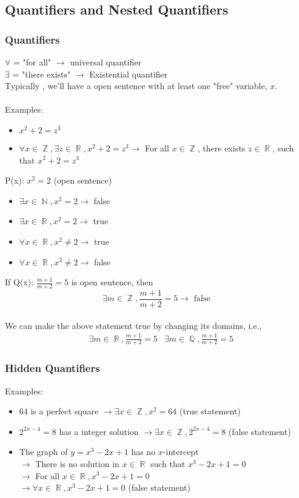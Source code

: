 \documentclass[10pt]{article}
\DeclareMathOperator{\N}{{\mathbb{N}}}
\DeclareMathOperator{\Q}{{\mathbb{Q}}}
\DeclareMathOperator{\Z}{{\mathbb{Z}}}
\DeclareMathOperator{\R}{{\mathbb{R}}}
\theoremstyle{break}
\begin{document}
\subsection{Quantifiers and Nested Quantifiers}
\subsubsection{Quantifiers}
$\forall$ = "for all" $\to$ universal quantifier\\
$\exists$ = "there exists" $\to$ Existential quantifier\\
Typically , we'll have a open sentence with at least one "free" variable, $x$. 
\\ \vspace{1ex} \\
Examples: 
\begin{itemize}
    \item $x^2 + 2 = z^3$
    \item $\forall x \in \Z, \exists z \in \R, x^2 + 2 = z^3 \to $ For all $x \in \Z$, there exists $z \in \R$, such that $x^2 + 2 = z^3$
\end{itemize}
P(x): $x^2 = 2$ (open sentence)
\begin{itemize}
    \item $\exists x \in \N, x^2 = 2 \to $ false
    \item $\exists x \in \R, x^2 = 2 \to $ true
    \item $\forall x \in \R, x^2 \ne 2 \to $ true
    \item $\forall x \in \R, x^2 \ne 2 \to $ false
\end{itemize}
If Q(x): $\frac{m+1}{m+2} = 5$ is open sentence, then \\
$$\exists m \in \Z, \frac{m+1}{m+2} = 5 \to \text{ false }$$\\
We can make the above statement true by changing its domains, i.e., \\
\begin{align*}
    &\exists m \in \R, \frac{m+1}{m+2} = 5
    &\exists m \in \Q, \frac{m+1}{m+2} = 5
\end{align*}
\subsubsection{Hidden Quantifiers}
Examples:
\begin{itemize}
    \item $64$ is a perfect square $\to \exists x \in \Z, x^2 = 64$ (true statement)
    \item $2^{2x - 4} = 8$ has a integer solution $\to \exists x \in \Z, 2^{2x - 4} = 8$ (false statement)
    \item The graph of $y = x^3 - 2x + 1$ has no $x$-intercept\\ $\to $ There is no solution in $x \in \R$ such that $x^3 - 2x + 1 = 0$ \\ $\to$ For all $x \in \R, x^3 - 2x + 1 = 0$ \\$\to \forall x \in \R, x^3 - 2x + 1 = 0$ (false statement)
\end{itemize}
\end{document}
